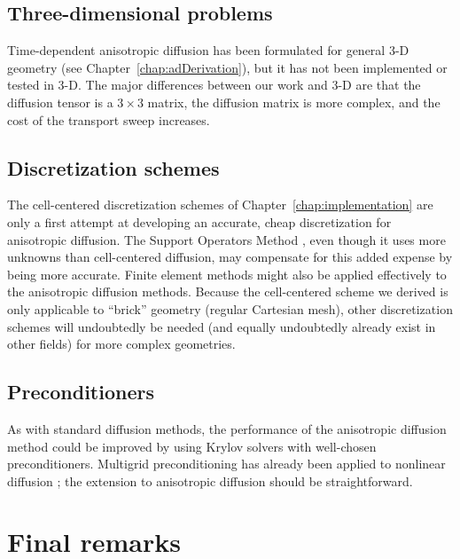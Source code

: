 \subsection{Three-dimensional problems}

Time-dependent anisotropic diffusion has been formulated for general
3-D geometry (see Chapter~\ref{chap:adDerivation}), but it has not
been implemented or tested in 3-D. The major differences between our work
and 3-D are that the
diffusion tensor is a $3\times 3$ matrix, the diffusion matrix is more
complex, and the cost of the transport sweep increases.

\subsection{Discretization schemes}

The cell-centered discretization schemes of Chapter~\ref{chap:implementation}
are only a first attempt at developing an accurate, cheap discretization for
anisotropic diffusion. The Support Operators Method
\cite{Mor1998,Run2006}, even though it uses more unknowns than
cell-centered diffusion, may compensate for this added expense by being more accurate. Finite element
methods might also be applied effectively to the anisotropic diffusion methods.
Because the cell-centered scheme we derived is only applicable to ``brick''
geometry (regular Cartesian mesh), other discretization schemes will undoubtedly
be needed (and equally undoubtedly already exist in other fields) for more
complex geometries.

\subsection{Preconditioners}

As with standard diffusion methods, the performance of the anisotropic diffusion method could be improved
by using Krylov solvers with well-chosen preconditioners. Multigrid
preconditioning has already been applied to nonlinear diffusion \cite{Rid1999};
the extension to anisotropic diffusion should be straightforward.

\section{Final remarks}

